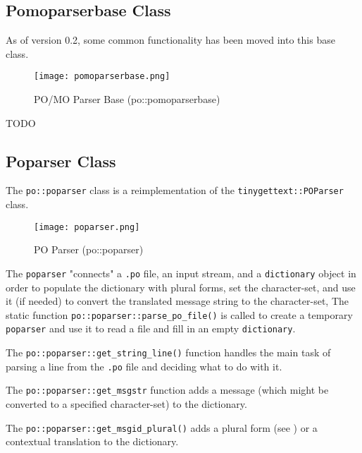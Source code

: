 \subsection{Pomoparserbase Class}
\label{subsec:potext_pomoparserbase_class}

   As of version 0.2, some common functionality has been moved into
   this base class.

\begin{figure}[H]
   \centering 
   \texttt{[image: pomoparserbase.png]}
   \caption{PO/MO Parser Base (po::pomoparserbase)}
   \label{fig:potext_pomoparserbase}
\end{figure}

   TODO

\subsection{Poparser Class}
\label{subsec:potext_poparser_class}

   The \texttt{po::poparser} class is a reimplementation of the
   \texttt{tinygettext::POParser} class.

\begin{figure}[H]
   \centering 
   \texttt{[image: poparser.png]}
   \caption{PO Parser (po::poparser)}
   \label{fig:potext_poparser}
\end{figure}

   The \texttt{poparser} "connects" a \texttt{.po} file, an input stream,
   and a \texttt{dictionary} object in order to populate the dictionary with
   plural forms, set the character-set, and use it (if needed) to convert the
   translated message string to the character-set,
   The static function \texttt{po::poparser::parse\_po\_file()} is called to
   create a temporary \texttt{poparser} and use it to
   read a file and fill in an empty \texttt{dictionary}.

   The \texttt{po::poparser::get\_string\_line()} function handles the
   main task of parsing a line from the \texttt{.po} file and deciding
   what to do with it.

   The \texttt{po::poparser::get\_msgstr} function adds a message (which might
   be converted to a specified character-set) to the dictionary.

   The \texttt{po::poparser::get\_msgid\_plural()} adds a plural form
   (see )
   or a contextual translation to the dictionary.


